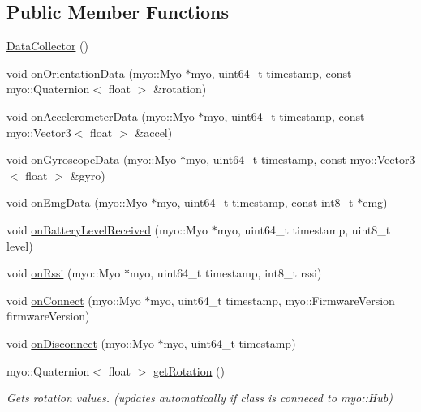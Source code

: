 \subsection*{Public Member Functions}
\begin{DoxyCompactItemize}
\item 
\mbox{\hyperlink{class_data_collector_a6f7eccfdf026a83317c386a18d16397d}{Data\+Collector}} ()
\item 
void \mbox{\hyperlink{class_data_collector_a7e54df882eed064e4059b3361dff796f}{on\+Orientation\+Data}} (myo\+::\+Myo $\ast$myo, uint64\+\_\+t timestamp, const myo\+::\+Quaternion$<$ float $>$ \&rotation)
\item 
void \mbox{\hyperlink{class_data_collector_af284c1bda701eb04d8278848672a1be6}{on\+Accelerometer\+Data}} (myo\+::\+Myo $\ast$myo, uint64\+\_\+t timestamp, const myo\+::\+Vector3$<$ float $>$ \&accel)
\item 
void \mbox{\hyperlink{class_data_collector_a46ee5fda02554a8d84a0f449026dcfac}{on\+Gyroscope\+Data}} (myo\+::\+Myo $\ast$myo, uint64\+\_\+t timestamp, const myo\+::\+Vector3$<$ float $>$ \&gyro)
\item 
void \mbox{\hyperlink{class_data_collector_a43639de09ccb9c540a3d21d267e7460a}{on\+Emg\+Data}} (myo\+::\+Myo $\ast$myo, uint64\+\_\+t timestamp, const int8\+\_\+t $\ast$emg)
\item 
void \mbox{\hyperlink{class_data_collector_a56a6c61925d54439459fc1599f76c601}{on\+Battery\+Level\+Received}} (myo\+::\+Myo $\ast$myo, uint64\+\_\+t timestamp, uint8\+\_\+t level)
\item 
void \mbox{\hyperlink{class_data_collector_aff0d95e10b014c460bf859abd6a01f74}{on\+Rssi}} (myo\+::\+Myo $\ast$myo, uint64\+\_\+t timestamp, int8\+\_\+t rssi)
\item 
void \mbox{\hyperlink{class_data_collector_a8e6ee72005537474eb45f2a9310fa540}{on\+Connect}} (myo\+::\+Myo $\ast$myo, uint64\+\_\+t timestamp, myo\+::\+Firmware\+Version firmware\+Version)
\item 
void \mbox{\hyperlink{class_data_collector_a89d1d780cdf635c607707f90b0665d50}{on\+Disconnect}} (myo\+::\+Myo $\ast$myo, uint64\+\_\+t timestamp)
\item 
myo\+::\+Quaternion$<$ float $>$ \mbox{\hyperlink{class_data_collector_a46a7e8adb8679fde1021fe89ed0d0be0}{get\+Rotation}} ()
\begin{DoxyCompactList}\small\item\em Gets rotation values. (updates automatically if class is conneced to myo\+::\+Hub) \end{DoxyCompactList}\item 

\end{DoxyCompactItemize}
